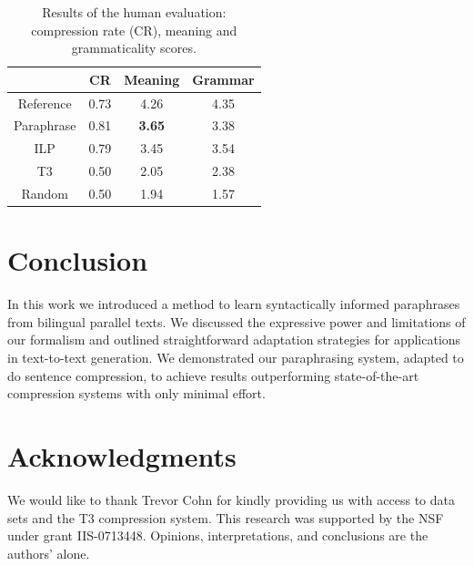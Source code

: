 \documentclass[11pt]{article}
\begin{document}
\begin{table}
\small
\begin{center}
\begin{tabular}{|c|c|c|c|}
  \hline
  & CR & Meaning & Grammar \\
  \hline
  Reference & 0.73 &  4.26 & 4.35 \\
  Paraphrase & 0.81 & {\bf 3.65} & 3.38 \\
  ILP & 0.79 & 3.45 & 3.54 \\
  T3 & 0.50 & 2.05 & 2.38 \\
  Random & 0.50 & 1.94 & 1.57 \\
  \hline
\end{tabular}
\end{center}
\normalsize
\caption{Results of the human evaluation: compression rate (CR),
  meaning and grammaticality scores. 
  }
\label{human_judgments}
\end{table}



\section{Conclusion} \label{conclusion}

In this work we introduced a method to learn syntactically informed
paraphrases from bilingual parallel texts. We discussed the expressive
power and limitations of our formalism and outlined straightforward
adaptation strategies for applications in text-to-text generation. We
demonstrated our paraphrasing system, adapted to do sentence
compression, to achieve results outperforming state-of-the-art
compression systems with only minimal effort.

\section*{Acknowledgments}
 We would like to thank Trevor Cohn for kindly providing us with
 access to data sets and the T3 compression system.
This research was supported by the NSF under grant IIS-0713448. Opinions, interpretations, and conclusions are the authors' alone.



\end{document}
